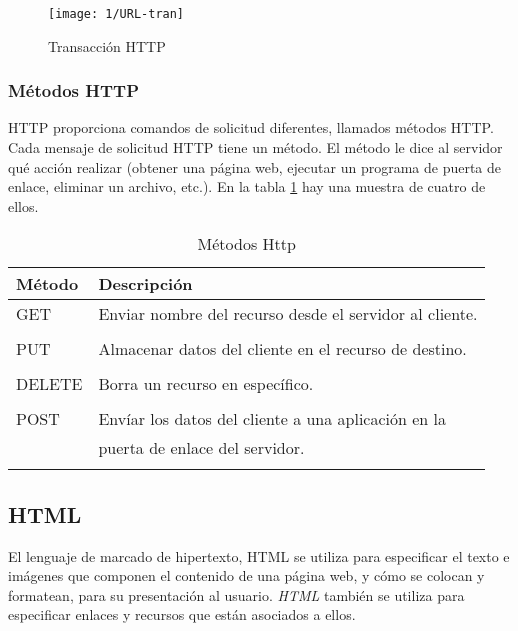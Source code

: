 	\begin{figure} %
				\begin{center}
		\texttt{[image: 1/URL-tran]}
		\caption{Transacción HTTP }
		\label{fig:URL-tran}
				\end{center}
	\end{figure}
	
	\subsubsection{Métodos HTTP}  
         HTTP proporciona  comandos de solicitud diferentes, llamados métodos HTTP. Cada mensaje de solicitud HTTP tiene un método. El método le dice al servidor qué acción realizar (obtener una página web, ejecutar un programa de puerta de enlace, eliminar un archivo, etc.). En la tabla \ref{tab:met-Http} hay una muestra de cuatro de ellos.

\begin{table}[H]
	\footnotesize%
	\begin{center}
		\footnotesize
		\begin{tabular}{ll}
			\toprule
			Método    &  Descripción    \\
			\midrule
			\quad GET  & Enviar nombre del recurso desde el servidor al cliente. \\  \\		\quad PUT  &  Almacenar datos del cliente en el recurso de destino. \\ \\	
			\quad DELETE & Borra  un recurso en específico. \\  \\	
			\quad POST & Envíar los datos del cliente a una aplicación en la \\ 
			\quad & puerta de enlace del servidor. \\				 
			\addlinespace 
			\bottomrule
		\end{tabular}
	\end{center}
	\caption{Métodos Http }
	\label{tab:met-Http}
\end{table}

\subsection{HTML}  
El lenguaje de marcado de hipertexto, \gls{HTML} se utiliza para especificar el texto e imágenes que componen el contenido de una página web, y  cómo se colocan y formatean,  para su presentación al usuario. \textit{HTML} también se utiliza para especificar enlaces y  recursos que están asociados a ellos. \cite{W3C2022}

